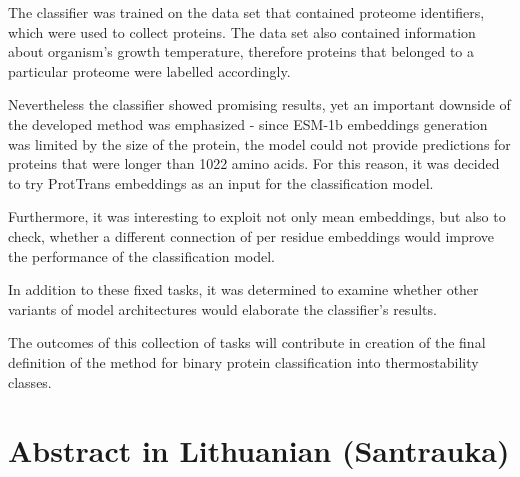 \documentclass[12pt]{article}
\begin{document}
    The classifier was trained on the data set 
	\cite{engqvist_martin_karl_magnus_2018_1175609} that contained 
	proteome identifiers, which were used 
    to collect proteins. The data set also contained information 
	about organism's growth temperature, therefore proteins that 
	belonged to a particular proteome were labelled accordingly. 

    Nevertheless the classifier showed promising results, yet an
    important downside of the developed method was emphasized -
    since ESM-1b embeddings generation was limited by the size 
    of the protein, the model could not provide predictions for 
    proteins that were longer than 1022 amino acids. For this 
    reason, it was decided to try ProtTrans 
	\cite{elnaggar2020prottrans} embeddings as an 
    input for the classification model.

    Furthermore, it was interesting to exploit not only mean 
    embeddings, but also to check, whether a different 
    connection of per residue embeddings would improve the 
    performance of the classification model.

    In addition to these fixed tasks, it was determined to 
    examine whether other variants of model architectures 
    would elaborate the classifier's results.

    The outcomes of this collection of tasks will 
    contribute in creation of the final definition of the method
    for binary protein classification into thermostability 
    classes.

	\normalsize

	\newpage

	\section{Abstract in Lithuanian (Santrauka)}
\end{document}
